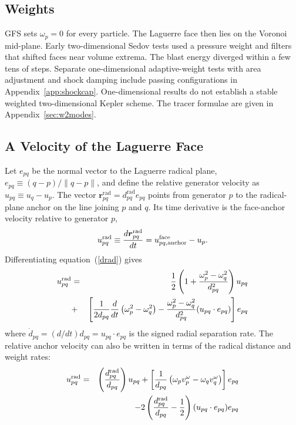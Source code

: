 \documentclass[twocolumn]{aastex63}
\newcommand{\vel}{{u}}
\begin{document}
\subsection{Weights}
\label{sec:weights}
GFS sets $\omega_p=0$ for every particle.
The Laguerre face then lies on the Voronoi mid-plane.
Early two-dimensional Sedov tests used a pressure weight and filters that
shifted faces near volume extrema. The blast energy diverged within a few tens
of steps. Separate one-dimensional adaptive-weight tests with area adjustment
and shock damping include passing configurations in Appendix~\ref{app:shockcap}.
One-dimensional results do not establish a stable weighted two-dimensional
Kepler scheme.
The tracer formulae are given in Appendix~\ref{sec:w2modes}.

\subsection{A Velocity of the Laguerre Face}
Let $e_{pq}$ be the normal vector to the Laguerre radical plane,
$e_{pq}\equiv(q-p)/\|q-p\|$, and define the relative generator velocity as
$\vel_{pq}\equiv\vel_q-\vel_p$. The vector
$\boldsymbol{r}_{pq}^\textrm{rad}=d_{pq}^\textrm{rad}e_{pq}$ points from
generator $p$ to the radical-plane anchor on the line joining $p$ and $q$.
Its time derivative is the face-anchor velocity relative to generator $p$,
\begin{equation}
  \vel_{pq}^\textrm{rad}\equiv
  {d\boldsymbol{r}_{pq}^\textrm{rad}\over dt}
  =\vel_{pq,\mathrm{anchor}}^\textrm{face}-\vel_p.
\end{equation}
Differentiating equation~(\ref{drad}) gives
\begin{eqnarray} \nonumber
	u^\textrm{rad}_{pq} &=&
	{1\over 2}  \left( 1+{ \omega^2_p -\omega^2_q \over d^2_{pq}}\right)\vel_{pq} \\
	&+&\left[{1\over2 d_{pq}}{{d  \over d t}\left(\omega^2_p -\omega^2_q\right) } 
	- {\omega_p^2-\omega_q^2 \over d_{pq}^2} (\vel_{pq}\cdot e_{pq}) \right] e_{pq}
\end{eqnarray} 
where $\dot d_{pq}=(d/dt)d_{pq}=\vel_{pq}\cdot e_{pq}$ is the signed
radial separation rate.
The relative anchor velocity can also be written in terms of the radical
distance and weight rates:
\begin{eqnarray}  \nonumber
	\vel_{pq}^\textrm{rad} 
	&=&   \left({d_{pq}^\textrm{rad}\over d_{pq}}\right){\vel_{pq}} \nonumber
	  	+  \left[{1\over d_{pq}}    \left( {\omega_p}v^\omega_{p} -{\omega_q }  {v^\omega_{q} }\right)  \right] e_{pq} \\  	\label{vel_rad}
		&&- 2\left({d_{pq}^\textrm{rad}\over d_{pq}}-{1\over2}\right) (\vel_{pq}\cdot e_{pq}) e_{pq}  
\end{eqnarray}
\end{document}
